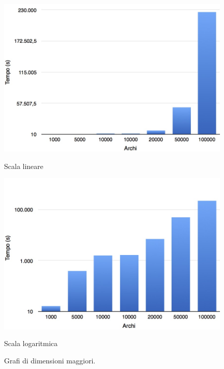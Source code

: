 \begin{figure}[h!]
	\vspace*{1cm}
	\begin{minipage}{0.40\textwidth}
		\centering
		\includegraphics[scale=.25]{img/big.jpg}
		\caption{Scala lineare}
	\end{minipage}\hfill
	\begin{minipage}{0.40\textwidth}
		\centering
		\includegraphics[scale=.25]{img/big_log.jpg}
		\caption{Scala logaritmica}
	\end{minipage}
	\caption*{Grafi di dimensioni maggiori.}
\end{figure}
\clearpage
